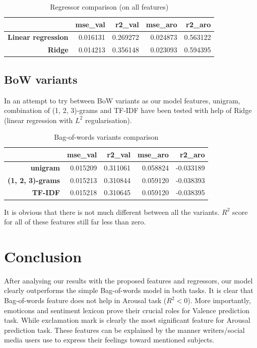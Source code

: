 \documentclass[12pt]{article}
\begin{document}
\begin{table}[H]
	\centering
	\begin{tabular}{| r | r | r | r | r |}
		\hline
		& \textbf{mse\_val} & \textbf{r2\_val} & \textbf{mse\_aro} & \textbf{r2\_aro}\\
		\hline
		\textbf{Linear regression} & 0.016131 & 0.269272 & 0.024873 & 0.563122\\
		\textbf{Ridge} & 0.014213 & 0.356148 & 0.023093 & 0.594395\\
		\hline
	\end{tabular}
	\caption{Regressor comparison (on all features)}
	\label{tb:regr_comp}
\end{table}

\subsection{BoW variants}
In an attempt to try between BoW variants as our model features, unigram, combination of (1, 2, 3)-grams and TF-IDF have been tested with help of Ridge (linear regression with $L^2$ regularisation).

\begin{table}[H]
	\centering
	\begin{tabular}{| r | r | r | r | r |}
		\hline
		& \textbf{mse\_val} & \textbf{r2\_val} & \textbf{mse\_aro} & \textbf{r2\_aro}\\
		\hline
		\textbf{unigram} & 0.015209 & 0.311061 & 0.058824 & -0.033189\\
		\textbf{(1, 2, 3)-grams} & 0.015213 & 0.310844 & 0.059120 & -0.038393\\
		\textbf{TF-IDF} & 0.015218 & 0.310645 & 0.059120 & -0.038395\\
		\hline
	\end{tabular}
	\caption{Bag-of-words variants comparison}
	\label{tb:bow_comp}
\end{table}

It is obvious that there is not much different between all the variants. $R^2$ score for all of these features still far less than zero.

\section{Conclusion} \label{conclusion}

After analysing our results with the proposed features and regressors, our model clearly outperforms the simple Bag-of-words model in both tasks. It is clear that Bag-of-words feature does not help in Arousal task ($R^2 < 0$). More importantly, emoticons and sentiment lexicon prove their crucial roles for Valence prediction task. While exclamation mark is clearly the most significant feature for Arousal prediction task. These features can be explained by the manner writers/social media users use to express their feelings toward mentioned subjects.
\end{document}
